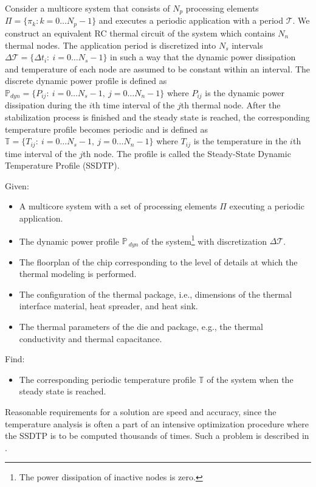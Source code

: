 Consider a multicore system that consists of $N_p$ processing elements $\Pi = \{ \pi_k: k = 0 \dots N_p - 1 \}$ and executes a periodic application with a period $\mathcal{T}$. We construct an equivalent RC thermal circuit of the system which contains $N_n$ thermal nodes. The application period is discretized into $N_s$ intervals \mbox{$\Delta \mathcal{T} = \{ \Delta t_i: \: i = 0 \dots N_s - 1 \}$} in such a way that the dynamic power dissipation and temperature of each node are assumed to be constant within an interval. The discrete dynamic power profile is defined as \mbox{$\mathbb{P}_{dyn} = \{ P_{ij}: \: i = 0 \dots N_s - 1, \: j = 0 \dots N_n - 1 \}$} where $P_{ij}$ is the dynamic power dissipation during the $i$th time interval of the $j$th thermal node. After the stabilization process is finished and the steady state is reached, the corresponding temperature profile becomes periodic and is defined as \mbox{$\mathbb{T} = \{ T_{ij}: \: i = 0 \dots N_s - 1, \: j = 0 \dots N_n - 1 \}$} where $T_{ij}$ is the temperature in the $i$th time interval of the $j$th node. The profile is called the Steady-State Dynamic Temperature Profile (SSDTP).

Given:
\begin{itemize}
  \item A multicore system with a set of processing elements $\Pi$ executing a periodic application.
  \item The dynamic power profile $\mathbb{P}_{\:dyn}$ of the system\footnote{The power dissipation of inactive nodes is zero.} with discretization $\Delta \mathcal{T}$.
  \item The floorplan of the chip corresponding to the level of details at which the thermal modeling is performed.
  \item The configuration of the thermal package, i.e., dimensions of the thermal interface material, heat spreader, and heat sink.
  \item The thermal parameters of the die and package, e.g., the thermal conductivity and thermal capacitance.
\end{itemize}

Find:
\begin{itemize}
  \item The corresponding periodic temperature profile $\mathbb{T}$ of the system when the steady state is reached.
\end{itemize}

Reasonable requirements for a solution are speed and accuracy, since the temperature analysis is often a part of an intensive optimization procedure where the SSDTP is to be computed thousands of times. Such a problem is described in .
